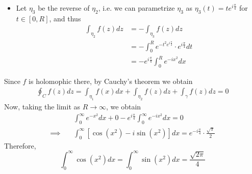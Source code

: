 \begin{solution}
\begin{itemize}
    
  \item Let $\eta_3$ be the reverse of $\eta_2$, i.e. we can
    parametrize $\eta_3$ as $\eta_3(t)=te^{i\frac\pi 4}$ for
    $t\in [0,R]$, and thus
    \begin{align*}
      \int_{\eta_2}f(z)dz
      & = -\int_{\eta_3} f(z)dz\\
      & = -\int_{0}^{R} e^{-t^2e^{i\frac\pi 2}}\cdot e^{i\frac\pi 4} dt\\
      & = -e^{i\frac\pi 4}\int_{0}^{R}e^{-ix^2}dx
    \end{align*}
  \end{itemize}
  Since $f$ is holomophic there, by Cauchy's theorem we obtain
  \begin{align*}
  	\oint_C f(z)dz=
    \int_{\eta_1}f(x)dx + \int_{\eta_2}f(z)dz + \int_{\gamma}f(z)dz=0
  \end{align*}
  Now, taking the limit as $R\to\infty$, we obtain
  \begin{align*}
  	&\int_0^{\infty}e^{-x^2}dx+0-e^{i\frac\pi 4}\int_0^\infty e^{-ix^2}dx=0\\\implies\quad
    &\int_0^{\infty}[\cos(x^2)-i\sin(x^2)]dx = e^{-i\frac\pi 4}\cdot \frac{\sqrt\pi}2
  \end{align*}
  Therefore,
  \[
    \boxed{\int_{0}^{\infty}\cos(x^2)dx=\int_{0}^{\infty}\sin(x^2)dx=\frac{\sqrt{2\pi}}{4}}
  \]
\end{solution}




